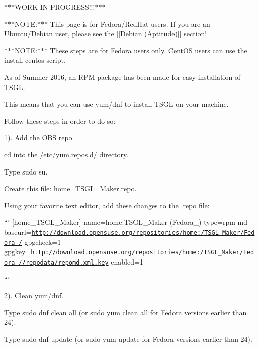 $\ast$$\ast$$\ast$\-W\-O\-R\-K I\-N P\-R\-O\-G\-R\-E\-S\-S!!!$\ast$$\ast$$\ast$

$\ast$$\ast$$\ast$\-N\-O\-T\-E\-:$\ast$$\ast$$\ast$ This page is for Fedora/\-Red\-Hat users. If you are an Ubuntu/\-Debian user, please see the \mbox{[}\mbox{[}Debian (Aptitude)\mbox{]}\mbox{]} section!

$\ast$$\ast$$\ast$\-N\-O\-T\-E\-:$\ast$$\ast$$\ast$ These steps are for Fedora users only. Cent\-O\-S users can use the {\ttfamily install-\/centos} script.

As of Summer 2016, an R\-P\-M package has been made for easy installation of T\-S\-G\-L.

This means that you can use yum/dnf to install T\-S\-G\-L on your machine.

Follow these steps in order to do so\-:

1). Add the O\-B\-S repo.


\begin{DoxyItemize}
\item {\ttfamily cd} into the {\ttfamily /etc/yum.repos.\-d/} directory.
\item Type {\ttfamily sudo su}.
\item Create this file\-: {\ttfamily home\-\_\-\-T\-S\-G\-L\-\_\-\-Maker.\-repo}.
\item Using your favorite text editor, add these changes to the {\ttfamily .repo} file\-:
\end{DoxyItemize}

``` \mbox{[}home\-\_\-\-T\-S\-G\-L\-\_\-\-Maker\mbox{]} name=home\-:T\-S\-G\-L\-\_\-\-Maker (Fedora\-\_) type=rpm-\/md baseurl=\href{http://download.opensuse.org/repositories/home:/TSGL_Maker/Fedora_24/}{\tt http\-://download.\-opensuse.\-org/repositories/home\-:/\-T\-S\-G\-L\-\_\-\-Maker/\-Fedora\-\_/} gpgcheck=1 gpgkey=\href{http://download.opensuse.org/repositories/home:/TSGL_Maker/Fedora_24//repodata/repomd.xml.key}{\tt http\-://download.\-opensuse.\-org/repositories/home\-:/\-T\-S\-G\-L\-\_\-\-Maker/\-Fedora\-\_//repodata/repomd.\-xml.\-key} enabled=1

```

2). Clean yum/dnf.


\begin{DoxyItemize}
\item Type {\ttfamily sudo dnf clean all} (or {\ttfamily sudo yum clean all} for Fedora versions earlier than 24).
\item Type {\ttfamily sudo dnf update} (or {\ttfamily sudo yum update} for Fedora versions earlier than 24).
\end{DoxyItemize}

